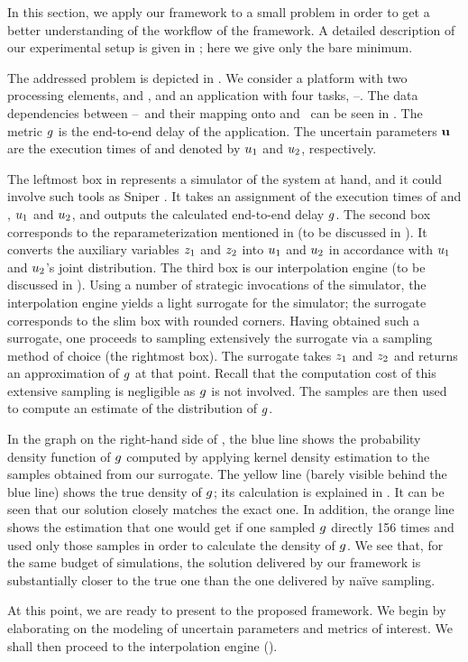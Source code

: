In this section, we apply our framework to a small problem in order to get a
better understanding of the workflow of the framework. A detailed description of
our experimental setup is given in ; here we give only the
bare minimum.

\newcommand{\cores}{\token{PE1} and \token{PE2}}
\newcommand{\tasks}{\token{T1}--\token{T4}}
The addressed problem is depicted in . We consider a platform with
two processing elements, \cores, and an application with four tasks, \tasks. The
data dependencies between \tasks\ and their mapping onto \cores\ can be seen in
. The metric $g$ is the end-to-end delay of the application. The
uncertain parameters $\mathbf{u}$ are the execution times of  and 
denoted by $u_1$ and $u_2$, respectively.

The leftmost box in  represents a simulator of the system at hand,
and it could involve such tools as Sniper \cite{carlson2011}. It takes an
assignment of the execution times of  and , $u_1$ and
$u_2$, and outputs the calculated end-to-end delay $g$. The second box
corresponds to the reparameterization mentioned in  (to be
discussed in ). It converts the auxiliary variables $z_1$ and
$z_2$ into $u_1$ and $u_2$ in accordance with $u_1$ and $u_2$'s joint
distribution. The third box is our interpolation engine (to be discussed in
). Using a number of strategic invocations of the simulator,
the interpolation engine yields a light surrogate for the simulator; the
surrogate corresponds to the slim box with rounded corners. Having obtained such
a surrogate, one proceeds to sampling extensively the surrogate via a sampling
method of choice (the rightmost box). The surrogate takes $z_1$ and $z_2$ and
returns an approximation of $g$ at that point. Recall that the computation cost
of this extensive sampling is negligible as $g$ is not involved. The samples
are then used to compute an estimate of the distribution of $g$.

In the graph on the right-hand side of , the blue line shows the
probability density function of $g$ computed by applying kernel density
estimation to the samples obtained from our surrogate. The yellow line (barely
visible behind the blue line) shows the true density of $g$; its calculation is
explained in . It can be seen that our solution closely
matches the exact one. In addition, the orange line shows the estimation that
one would get if one sampled $g$ directly 156 times and used only those samples
in order to calculate the density of $g$. We see that, for the same budget of
simulations, the solution delivered by our framework is substantially closer to
the true one than the one delivered by na\"{i}ve sampling.

At this point, we are ready to present to the proposed framework. We begin by
elaborating on the modeling of uncertain parameters and metrics of interest. We
shall then proceed to the interpolation engine ().
